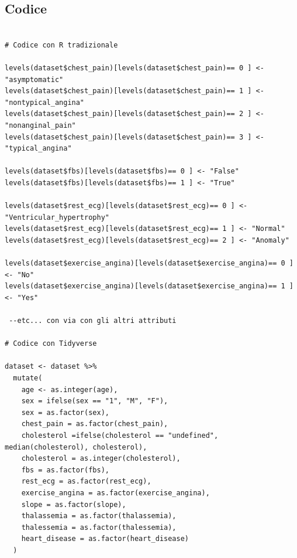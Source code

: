 \documentclass{article}
\begin{document}
\subsection { Codice }

\begin{lstlisting}

# Codice con R tradizionale 

levels(dataset$chest_pain)[levels(dataset$chest_pain)== 0 ] <- "asymptomatic"
levels(dataset$chest_pain)[levels(dataset$chest_pain)== 1 ] <- "nontypical_angina"
levels(dataset$chest_pain)[levels(dataset$chest_pain)== 2 ] <- "nonanginal_pain"
levels(dataset$chest_pain)[levels(dataset$chest_pain)== 3 ] <- "typical_angina"

levels(dataset$fbs)[levels(dataset$fbs)== 0 ] <- "False"
levels(dataset$fbs)[levels(dataset$fbs)== 1 ] <- "True"

levels(dataset$rest_ecg)[levels(dataset$rest_ecg)== 0 ] <- "Ventricular_hypertrophy"
levels(dataset$rest_ecg)[levels(dataset$rest_ecg)== 1 ] <- "Normal"
levels(dataset$rest_ecg)[levels(dataset$rest_ecg)== 2 ] <- "Anomaly"

levels(dataset$exercise_angina)[levels(dataset$exercise_angina)== 0 ] <- "No"
levels(dataset$exercise_angina)[levels(dataset$exercise_angina)== 1 ] <- "Yes"

 --etc... con via con gli altri attributi

# Codice con Tidyverse

dataset <- dataset %>% 
  mutate(
    age <- as.integer(age),
    sex = ifelse(sex == "1", "M", "F"),
    sex = as.factor(sex),
    chest_pain = as.factor(chest_pain),
    cholesterol =ifelse(cholesterol == "undefined",         median(cholesterol), cholesterol),
    cholesterol = as.integer(cholesterol),
    fbs = as.factor(fbs),
    rest_ecg = as.factor(rest_ecg),
    exercise_angina = as.factor(exercise_angina),
    slope = as.factor(slope),
    thalassemia = as.factor(thalassemia),
    thalessemia = as.factor(thalessemia),
    heart_disease = as.factor(heart_disease)
  )

 \end{lstlisting}
\end{document}
